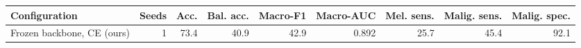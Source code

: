 \begin{tabular}{lrrrrrrrr}
\toprule
Configuration & Seeds & Acc. & Bal. acc. & Macro-F1 & Macro-AUC & Mel. sens. & Malig. sens. & Malig. spec. \\
\midrule
Frozen backbone, CE (ours) & 1 & 73.4 & 40.9 & 42.9 & 0.892 & 25.7 & 45.4 & 92.1 \\
\bottomrule
\end{tabular}

